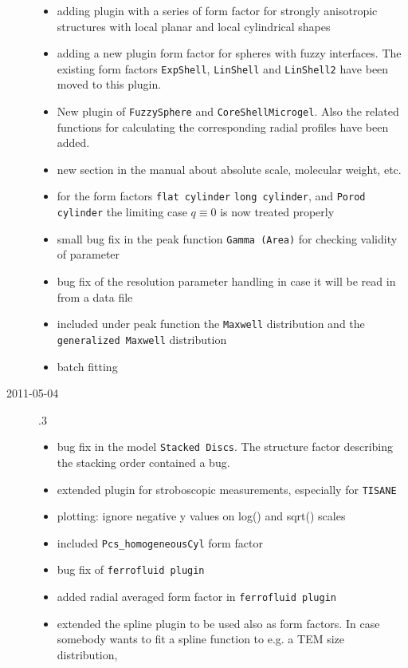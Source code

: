 \begin{description}
\begin{itemize}
      \item adding plugin with a series of form factor for strongly anisotropic structures
            with local planar and local cylindrical shapes
      \item adding a new plugin form factor for spheres with fuzzy interfaces. The existing form factors
            \texttt{ExpShell}, \texttt{LinShell} and \texttt{LinShell2} have been moved to this plugin.
      \item New plugin of \texttt{FuzzySphere} and \texttt{CoreShellMicrogel}.
            Also the related functions for calculating the corresponding radial profiles have been added.
      \item new section in the manual about absolute scale, molecular weight, etc.
      \item for the form factors \texttt{flat cylinder} \texttt{long cylinder}, and \texttt{Porod cylinder}
            the limiting case $q \equiv 0$ is now treated properly
      \item small bug fix in the peak function \texttt{Gamma (Area)} for checking
            validity of parameter
      \item bug fix of the resolution parameter handling in case it will be read in from a data file
      \item included under peak function the \texttt{Maxwell} distribution and the
            \texttt{generalized Maxwell} distribution
      \item batch fitting
    \end{itemize}
    \item[2011-05-04] .3
        \begin{itemize}
        \item  bug fix in the model \texttt{Stacked Discs}. The structure factor describing the
            stacking order contained a bug.
        \item extended plugin for stroboscopic measurements, especially for \texttt{TISANE}
        \item plotting: ignore negative y values on log() and sqrt() scales
        \item included \texttt{Pcs\_homogeneousCyl} form factor
        \item bug fix of \texttt{ferrofluid plugin}
        \item added radial averaged form factor in \texttt{ferrofluid plugin}
        \item extended the spline plugin to be used also as form factors.
            In case somebody wants to fit a spline function to e.g. a TEM size distribution,

\end{itemize}
\end{description}
